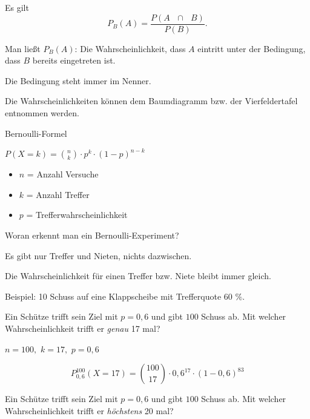 \documentclass[paper=a6,ngerman,twoside=true,fontsize=14pt, parskip = half]{scrartcl}
\begin{document}
\begin{antwort}
	Es gilt
	\[P_B(A)=\frac{P(A \text{ }\cap \text{ }B)}{P(B)}.\]

	Man ließt $P_B(A)$: Die Wahrscheinlichkeit, dass $A$ eintritt unter der Bedingung, dass $B$ bereits eingetreten ist.

	Die Bedingung steht immer im Nenner.

	Die Wahrscheinlichkeiten können dem Baumdiagramm bzw. der Vierfeldertafel
	entnommen werden.

\end{antwort}
\begin{frage}
	Bernoulli-Formel
	
\end{frage}
\begin{antwort}
	$P(X=k)=\binom{n}{k} \cdot p^k \cdot (1-p)^{n-k}$
	\begin{itemize}
		\item $n$ = Anzahl Versuche
		\item $k$ = Anzahl Treffer
		\item $p$ = Trefferwahrscheinlichkeit
	\end{itemize}	
\end{antwort}
\begin{frage}
	Woran erkennt man ein Bernoulli-Experiment?
	
\end{frage}
\begin{antwort}
	Es gibt nur Treffer und Nieten, nichts dazwischen.

	Die Wahrscheinlichkeit für einen Treffer bzw. Niete bleibt immer gleich.

	Beispiel: 10 Schuss auf eine Klappscheibe mit Trefferquote 60 $\%$.
\end{antwort}
\begin{frage}
	Ein Schütze trifft sein Ziel mit $p=0,6$ und gibt $100$ Schuss ab. Mit welcher Wahrscheinlichkeit trifft er 
	\emph{genau} 17 mal?
\end{frage}
\begin{antwort}
	$n=100,$ $k=17,$ $p=0,6$
	
	\bigskip

	\begin{equation*}
	P^{100}_{0,6}(X=17)=
	\binom{100}{17} \cdot 0,6^{17}
	\cdot (1-0,6)^{83}
	\end{equation*}
	
\end{antwort}
\begin{frage}
	Ein Schütze trifft sein Ziel mit $p=0,6$ und gibt $100$ Schuss ab. 
	Mit welcher Wahrscheinlichkeit trifft er
	\emph{höchstens} 20 mal?
	
\end{frage}
\end{document}
